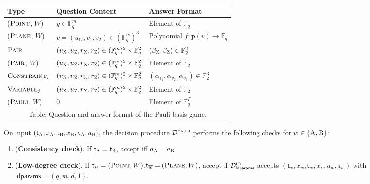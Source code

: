 \documentclass[11pt]{article}
\theoremstyle{definition}
\newcommand{\F}{\ensuremath{\mathbb{F}}}
\newcommand{\ld}{\textsc{ld}}
\newcommand{\pl}{\mathbf{p}}
\newcommand{\decider}{\mathcal{D}}
\newcommand{\gamestyle}[1]{\ensuremath{\textsc{#1}}\xspace}
\newcommand{\pauli}{\gamestyle{Pauli}}
\newcommand{\labelstyle}[1]{\ensuremath{\textsc{#1}}\xspace}
\newcommand{\xpt}{\labelstyle{X}}
\newcommand{\zpt}{\labelstyle{Z}}
\newcommand{\tvarstyle}[1]{\mathsf{#1}}
\newcommand{\tvar}{\ensuremath{\tvarstyle{t}}}
\newcommand{\alice}{\labelstyle{A}}
\newcommand{\bob}{\labelstyle{B}}
\newcommand{\typestyle}[1]{\ensuremath{\textsc{#1}}\xspace}
\newcommand{\Plane}{\typestyle{Plane}}
\newcommand{\Point}{\typestyle{Point}}
\newcommand{\Pair}{\typestyle{Pair}}
\newcommand{\Constraint}{\typestyle{Constraint}}
\newcommand{\Variable}{\typestyle{Variable}}
\newcommand{\Pauli}{\typestyle{Pauli}}
\newcommand{\AB}{\{\alice, \bob\}}
\newcommand{\ldparams}{\mathsf{ldparams}}
\newenvironment{gamespec}{
  \begin{mdframed}[style=figstyle]}{
  \end{mdframed}}
\newcommand{\hnote}[1]{}
\begin{document}
\begin{figure}[htbp!]
  \small
  \begin{gamespec}
    \vspace{9pt}
    \begin{center}
      \renewcommand\arraystretch{1.3}
      \begin{tabularx}{.92\textwidth}{ l X l }
        \toprule
        Type & Question Content & Answer Format \\
        \midrule
        (\Point, $W$) & $y \in  \F_q^m$ & Element of $\F_q$  \\
        (\Plane, $W$) & $v = (u_W, v_1, v_2) \in (\F_q^m)^3$
        & Polynomial $f: \pl(v) \to \F_q$\\
        \Pair & $(u_\xpt, u_\zpt, r_\xpt, r_\zpt) \in
        (\F_q^m)^2 \times \F_q^2 $ & $(\beta_\xpt,\beta_\zpt) \in \F_2^2$ \\
        (\Pair, $W$) & $(u_\xpt, u_\zpt, r_\xpt, r_\zpt) \in
        (\F_q^m)^2 \times \F_q^2 $ & Element of $\F_2$ \\
        $\Constraint_i$ & $(u_\xpt, u_\zpt, r_\xpt, r_\zpt) \in (\F_q^m)^2
        \times \F_q^2$ &
        $(\alpha_{v_1}, \alpha_{v_2}, \alpha_{v_3}) \in \F_2^3$ \\
        $\Variable_j$ & $(u_\xpt, u_\zpt, r_\xpt, r_\zpt) \in
        (\F_q^m)^2 \times \F_q^2$ & Element of $\F_2$ \\
        (\Pauli, $W$) & $0$ & Element of $\F_q^{\Gamma}$ \\
        \bottomrule \multicolumn{3}{c}{Table: Question and answer format of the
          Pauli basis game.}
      \end{tabularx}
    \end{center}
    \vspace{9pt}

    On input $(\tvar_\alice,x_\alice, \tvar_\bob, x_\bob, a_\alice, a_\bob)$,
    the decision procedure $\decider^\pauli$ performs the following checks for
    $w \in \AB$:
    \begin{enumerate}[itemsep=2pt,parsep=2pt]
    \item (\textbf{Consistency check}).
      \label{item:same-type}
      If $\tvar_\alice = \tvar_\bob$, accept iff $a_\alice = a_\bob$.

    \item (\textbf{Low-degree check}).
      \label{item:low-degree}
      If $\tvar_w = (\Point, W), \tvar_{\overline{w}} = (\Plane, W)$, accept if
      $\decider^\ld_{\ldparams}$ accepts $(\tvar_w, x_w, \tvar_{\overline{w}}, x_{\overline{w}}, a_w,
      a_{\overline{w}})$ 
with $\ldparams = (q,m,d,1)$.


\end{enumerate}
\end{gamespec}
\end{figure}
\end{document}
